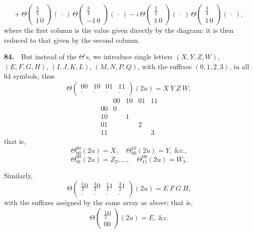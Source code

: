 \documentclass[11pt]{article}
\begin{document}
\[
+\ \Theta\!\begin{pmatrix}\tfrac{3}{4}\\ 1\,0\end{pmatrix}(\,\cdot\,)\,\Theta\!\begin{pmatrix}\tfrac{3}{4}\\ -1\,0\end{pmatrix}(\,\cdot\,) - i\,\Theta\!\begin{pmatrix}\tfrac{3}{4}\\ 1\,0\end{pmatrix}(\,\cdot\,)\,\Theta\!\begin{pmatrix}\tfrac{3}{4}\\ 1\,0\end{pmatrix}(\,\cdot\,),
\]
where the first column is the value given directly by the diagram: it is then reduced to that given by the second column.

\medskip

\textbf{84.}\ \ But instead of the $\Theta$'s, we introduce single letters $(X,Y,Z,W)$, $(E,F,G,H)$, $(I,J,K,L)$, $(M,N,P,Q)$, with the suffixes $(0,1,2,3)$, in all $64$ symbols, thus
\[
\Theta\!\begin{pmatrix}00 & 10 & 01 & 11\\[-2pt] \cdot & \cdot & \cdot & \cdot\end{pmatrix}(2u) = X\ Y\ Z\ W,
\]
\[
\begin{array}{c|cccc}
       & 00 & 10 & 01 & 11 \\ \hline
00 & 0 & & & \\
10 & & 1 & & \\
01 & & & 2 & \\
11 & & & & 3
\end{array}
\]
that is,
\[
\Theta_{00}^{00}(2u) = X,\quad \Theta_{00}^{10}(2u) = Y,\ \&c.,
\]
\[
\Theta_{01}^{00}(2u) = Z_2,\ldots,\quad \Theta_{11}^{00}(2u) = W_3.
\]

\medskip

\noindent Similarly,
\[
\Theta\!\begin{pmatrix}\tfrac{1}{2}0 & \tfrac{3}{2}0 & \tfrac{1}{2}1 & \tfrac{3}{2}1\\[-2pt] \cdot & \cdot & \cdot & \cdot\end{pmatrix}(2u) = E\ F\ G\ H,
\]
with the suffixes assigned by the same array as above; that is,
\[
\Theta\!\begin{pmatrix}\tfrac{1}{2}0\\ 00\end{pmatrix}(2u) = E,\ \&c.
\]
\end{document}
